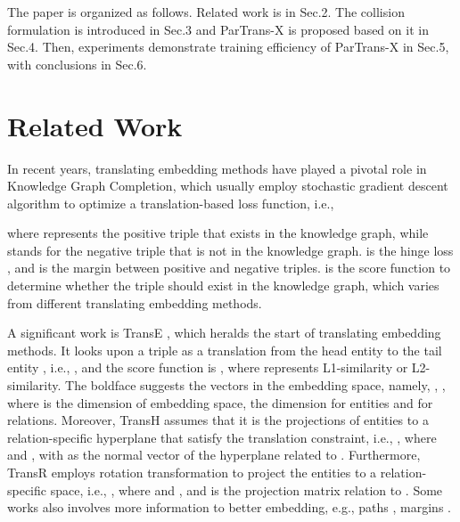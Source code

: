\documentclass[sigconf]{acmart}
\begin{document}
The paper is organized as follows. Related work is in Sec.2. The collision formulation is introduced in Sec.3 and ParTrans-X is proposed based on it in Sec.4.
Then, experiments demonstrate training efficiency of ParTrans-X in Sec.5, with conclusions in Sec.6. 


\section{Related Work}
In recent years, translating embedding methods have played a pivotal role in Knowledge Graph Completion, which usually employ stochastic gradient descent algorithm to optimize a translation-based loss function, i.e., 
 
where  represents the positive triple that exists in the knowledge graph, while  stands for the negative triple that is not in the knowledge graph.  is the hinge loss , and  is the margin between positive and negative triples.  is the score function to determine whether the triple  should exist in the knowledge graph, which varies from different translating embedding methods.


A significant work is TransE \cite{bordes2013translating}, which heralds the start of translating embedding methods. It looks upon a triple  as a translation from the head entity  to the tail entity , i.e., , and the score function is , where  represents L1-similarity or L2-similarity. The boldface suggests the vectors in the embedding space, namely, , , 
where  is the dimension of embedding space,  the dimension for entities and  for relations. 
Moreover, TransH \cite{Wang2014Knowledge} assumes that it is the projections of entities to a relation-specific hyperplane that satisfy the translation constraint, i.e., , where  and   , with  as the normal vector of the hyperplane related to .
Furthermore, TransR \cite{Lin2015Learning} employs rotation transformation to project the entities to a relation-specific space, i.e., , where  and , and  is the projection matrix relation to .
Some works also involves more information to better embedding, e.g., paths \cite{Lin2015Modeling},  margins \cite{jia2016locally}.
\end{document}
